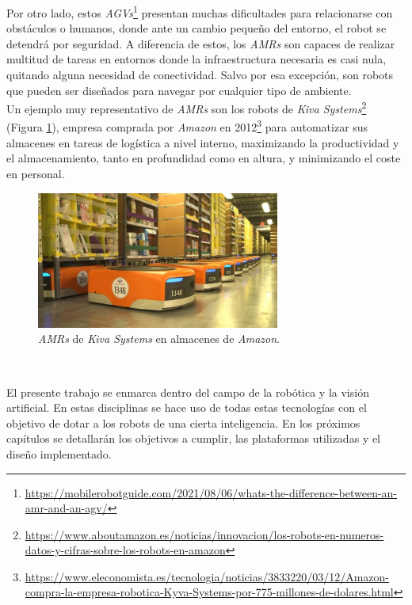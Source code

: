 Por otro lado, estos \textit{AGVs}\footnote{\url{https://mobilerobotguide.com/2021/08/06/whats-the-difference-between-an-amr-and-an-agv/}} presentan muchas dificultades para relacionarse con obstáculos o humanos, donde ante un cambio pequeño del entorno, el robot se detendrá por seguridad. A diferencia de estos, los \textit{AMRs} son capaces de realizar multitud de tareas en entornos donde la infraestructura necesaria es casi nula, quitando alguna necesidad de conectividad. Salvo por esa excepción, son robots que pueden ser diseñados para navegar por cualquier tipo de ambiente.\\

Un ejemplo muy representativo de \textit{AMRs} son los robots de \textit{Kiva Systems}\footnote{\url{https://www.aboutamazon.es/noticias/innovacion/los-robots-en-numeros-datos-y-cifras-sobre-los-robots-en-amazon}} (Figura \ref{fig:kivasystems}), empresa comprada por \textit{Amazon} en 2012\footnote{\url{https://www.eleconomista.es/tecnologia/noticias/3833220/03/12/Amazon-compra-la-empresa-robotica-Kyva-Systems-por-775-millones-de-dolares.html}} para automatizar sus almacenes en tareas de logística a nivel interno, maximizando la productividad y el almacenamiento, tanto en profundidad como en altura, y minimizando el coste en personal.\\

\begin{figure} [h!]
	\begin{center}
		\includegraphics[width=8cm]{figs/kivasystems}
	\end{center}
	\caption{\textit{AMRs} de \textit{Kiva Systems} en almacenes de \textit{Amazon}.}
	\label{fig:kivasystems}
\end{figure}\

El presente trabajo se enmarca dentro del campo de la robótica y la visión artificial. En estas disciplinas se hace uso de todas estas tecnologías con el objetivo de dotar a los robots de una cierta inteligencia. En los próximos capítulos se detallarán los objetivos a cumplir, las plataformas utilizadas y el diseño implementado.